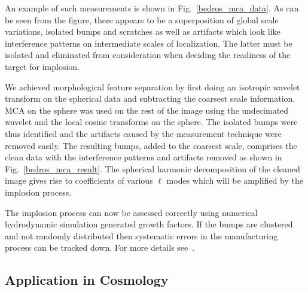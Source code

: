 An example of such measurements is shown in Fig.~\ref{bedros_mca_data}. As can be seen from the figure, there appears to be a superposition of global scale variations, isolated bumps and scratches as well as artifacts which look like interference patterns on intermediate scales of localization. The latter must be isolated and eliminated from consideration when deciding the readiness of the target for implosion. 

We achieved morphological feature separation by first doing an isotropic wavelet transform on the spherical data and subtracting the coarsest scale information. MCA on the sphere was used on the rest of the image using the undecimated wavelet and the local cosine transforms on the sphere. The isolated bumps were thus identified and the artifacts caused by the measurement technique were removed easily. The resulting bumps, added to the coarsest scale, comprises the clean data with the interference patterns and artifacts removed as shown in Fig.~\ref{bedros_mca_result}. The spherical harmonic decomposition of the cleaned image gives rise to coefficients of various $\ell$ modes which will be amplified by the implosion process.

The implosion process can now be assessed correctly using numerical hydrodynamic simulation generated growth factors. If the bumps are clustered and not randomly distributed then systematic errors in the manufacturing process can be tracked down. 
For more details see~\citet{bedros:modem}.
 
 
\subsection{Application in Cosmology}
\label{section:cmb}

